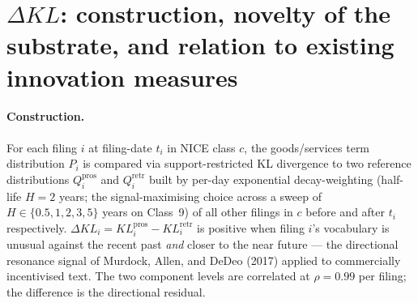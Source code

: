 \documentclass[11pt]{article}
\begin{document}
\begin{abstract}
\textbf{An unresolved asymmetry: harvest dominates the
public-listing signal.} The probability that a filing's owner ever
appears in SEC EDGAR (proxy for IPO/public listing) is, at the
filing level, monotone \emph{decreasing} in $\Delta KL$ rather than
$U$-shaped: $5.78\%$ at the most-negative $\Delta KL$ decile, $4.0\%$
at the flux-neutral middle, $3.49\%$ at the most-positive decile.
The harvest tail captures the EDGAR-listing pattern far more cleanly
than the innovation tail does. We do not have a single-mechanism
explanation for why late-stage-imitation filings are so much more
strongly associated with the public-listing outcome than novelty
filings are at the unit of one filing.

A long companion paper (\texttt{main.pdf}) reports the per-industry
detail, the financial-outcomes panel on $\sim 1{,}500$ SEC-listed
firms, the patent-counts crosswalk, the cluster-viability mediation,
and the per-NICE-class deep dives.
\end{abstract}

\section{$\Delta KL$: construction, novelty of the substrate, and relation to existing innovation measures}

\paragraph{Construction.} For each filing $i$ at filing-date $t_i$
in NICE class $c$, the goods/services term distribution $P_i$ is
compared via support-restricted KL divergence to two reference
distributions $Q_i^{\text{pros}}$ and $Q_i^{\text{retr}}$ built by
per-day exponential decay-weighting (half-life $H = 2$ years; the
signal-maximising choice across a sweep of $H \in \{0.5,1,2,3,5\}$
years on Class~9) of all other filings in $c$ before and after
$t_i$ respectively. $\Delta KL_i = KL_i^{\text{pros}} -
KL_i^{\text{retr}}$ is positive when filing $i$'s vocabulary is
unusual against the recent past \emph{and} closer to the near
future --- the directional resonance signal of Murdock, Allen, and
DeDeo (2017) applied to commercially incentivised text. The two
component levels are correlated at $\rho = 0.99$ per filing; the
difference is the directional residual.
\end{document}
